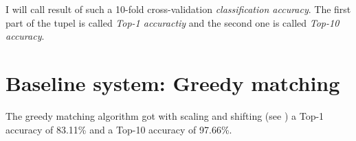 I will call result of such a 10-fold cross-validation
\textit{classification accuracy}. The first part of the tupel is called \textit{Top-1 accuractiy}
and the second one is called \textit{Top-10 accuracy}.

\section{Baseline system: Greedy matching}
The greedy matching algorithm got with scaling and shifting (see )
a Top-1 accuracy of 83.11\% and a Top-10 accuracy of 97.66\%.